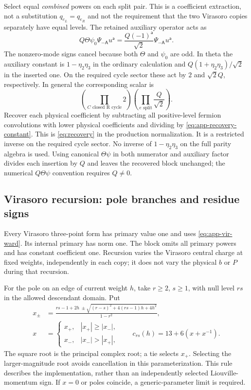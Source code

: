 Select equal \emph{combined} powers on each split pair. This is a
coefficient extraction, not a substitution $q_{e_L}=q_{e_R}$ and not
the requirement that the two Virasoro copies separately have equal
levels. The retained auxiliary operator acts as
\begin{equation}
 Q\Theta\psi_0\Psi_{-\mathsf A}u^{\mathsf a}
 =\frac{Q(-1)^{\mathsf a}}{\sqrt2}\Psi_{-\mathsf A}u^{\mathsf a}.
 \label{eq:app-diagonal-insertion}
\end{equation}
The nonzero-mode signs cancel because both $\Theta$ and $\psi_0$
are odd. In theta the auxiliary constant is $1-\eta_2\eta_3$ in
the ordinary calculation and
$Q(1+\eta_2\eta_3)/\sqrt2$ in the inserted one. On the required
cycle sector these act by $2$ and $\sqrt2Q$, respectively.
In general the corresponding scalar is
\begin{equation}
 \left(\prod_{C\text{ closed R cycle}}2\right)
 \left(\prod_{e\text{ split}}\frac Q{\sqrt2}\right).
 \label{eq:app-recovery-constant}
\end{equation}
Recover each physical coefficient by subtracting all positive-level
fermion convolutions with lower physical coefficients and dividing by
\eqref{eq:app-recovery-constant}. This is \eqref{eq:recovery} in the
production normalization. It is a restricted inverse on the required
cycle sector. No inverse of $1-\eta_2\eta_3$ on the full parity algebra
is used. Using canonical $\Theta\psi$ in both numerator and auxiliary
factor divides each insertion by $Q$ and leaves the recovered block
unchanged; the numerical $Q\Theta\psi$ convention requires $Q\ne0$.

\subsection{Virasoro recursion: pole branches and residue signs}
\label{app:ccy}

Every Virasoro three-point form has primary value one and uses
\eqref{eq:app-vir-ward}. Its internal primary has norm one. The block
omits all primary powers and has constant coefficient one. Recursion
varies the Virasoro central charge at fixed weights, independently in
each copy; it does not vary the physical $b$ or $P$ during that recursion.

For the pole on an edge of current weight $h$, take $r\ge2$, $s\ge1$,
with null level $rs$ in the allowed descendant domain. Put
\begin{align}
 x_\pm&=\frac{rs-1+2h\ \pm\sqrt{(r-s)^2+4(rs-1)h+4h^2}}{1-r^2},
 \nonumber\\
 x&=\begin{cases}x_+,&|x_+|\ge|x_-|,\\x_-,&|x_-|>|x_+|,
 \end{cases}
 \qquad c_{rs}(h)=13+6(x+x^{-1}).
 \label{eq:app-ccy-pole}
\end{align}
The square root is the principal complex root; a tie selects $x_+$.
Selecting the larger-magnitude root avoids cancellation in this
parameterization. This rule describes the implementation, rather than
an independently selected Liouville-momentum sign. If $x=0$ or poles
coincide, a generic-parameter limit is required.

